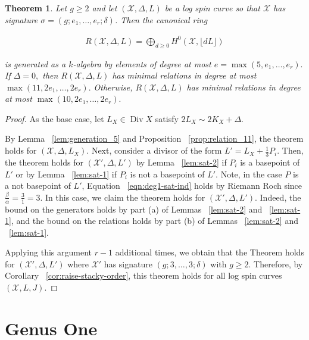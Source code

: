 \documentclass{amsart}
\theoremstyle{plain}
\newtheorem{thm}{Theorem}[section]
\theoremstyle{definition}
\theoremstyle{remark}
\numberwithin{equation}{section}
\newcommand \sx{\mathscr X}
\DeclareMathOperator\di{Div}
\newcommand{\halfcan}{L}
\begin{document}
\begin{thm}
\label{thm:g-high-main}
Let $g \geq 2$ and let $(\sx, \Delta, \halfcan)$ be a log spin curve so
that $\sx$ has signature $\sigma = (g; e_1, \ldots, e_r; \delta)$. Then the
canonical ring

\begin{align*}
	R(\sx, \Delta, \halfcan) = \bigoplus_{d \geq 0} H^0(\sx, \lfloor d L \rfloor)
\end{align*}

\noindent
is generated as a $k$-algebra by elements of degree at most $e =
\max(5, e_1, \ldots, e_r).$ If $\Delta = 0,$ then 
$R(\sx,\Delta, \halfcan)$ has minimal relations in degree at most $\max(11, 2e_1,
\ldots, 2e_r).$ Otherwise, $R(\sx, \Delta, \halfcan)$ has minimal relations in degree at most
$\max(10, 2e_1, \ldots, 2e_r).$
\end{thm}

\begin{proof}
As the base case, let $\halfcan_X \in \di X$ satisfy $2\halfcan_X \sim 2 K_X + \Delta$.

By Lemma ~\ref{lem:generation_5} and Proposition
~\ref{prop:relation_11}, the theorem holds for $(\sx, \Delta,
\halfcan_X)$. Next, consider a divisor of the form $\halfcan' =
\halfcan_X + \frac{1}{3} P_i$. Then, the theorem holds for $(\sx',
\Delta, \halfcan')$ by Lemma ~\ref{lem:sat-2}
 if $P_i$ is a basepoint of $\halfcan'$ or by Lemma
~\ref{lem:sat-1} if $P_i $ is not a basepoint of $L'$. Note,
in the case $P$  is a not basepoint of $\halfcan'$, Equation
~\ref{eqn:deg1-sat-ind} holds by Riemann Roch since $\frac{\beta}{\alpha} = \frac{3}{1}=3$. In this case, we claim the theorem holds for $(\sx',\Delta, L')$. Indeed, the bound on the generators holds by part (a) of Lemmas
~\ref{lem:sat-2} and ~\ref{lem:sat-1},
and the bound on the relations holds by part (b) of Lemmas
~\ref{lem:sat-2} and ~\ref{lem:sat-1}.

Applying this argument $r-1$ additional times, we obtain that the Theorem holds for $(\sx', \Delta, \halfcan')$ where $\sx'$ has signature $(g;3,\ldots, 3;\delta)$ with $g \geq 2$. Therefore, by Corollary 
~\ref{cor:raise-stacky-order}, this theorem 
holds for all log spin curves $(\sx, L, J)$. 
\end{proof}


\section{Genus One}
\label{sec:g_1}
\end{document}
